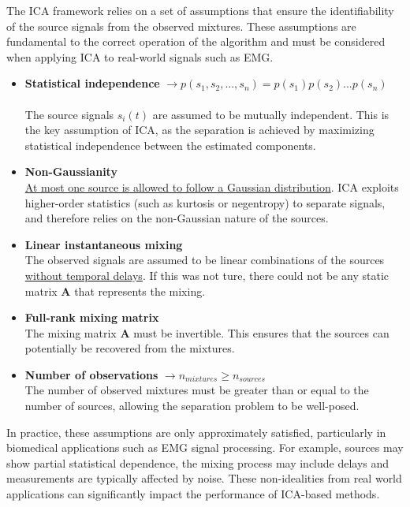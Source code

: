 The ICA framework relies on a set of assumptions that ensure the identifiability of the source signals from the observed mixtures. These assumptions are fundamental to the correct operation of the algorithm and must be considered when applying ICA to real-world signals such as EMG.

\begin{itemize}

\item \textbf{Statistical independence} $\rightarrow p(s_1,s_2,...,s_n)=p(s_1)p(s_2)...p(s_n)$ \\ \\
The source signals $s_i(t)$ are assumed to be mutually independent. This is the key assumption of ICA, as the separation is achieved by maximizing statistical independence between the estimated components.

\item \textbf{Non-Gaussianity} \\

\underline{At most one source is allowed to follow a Gaussian distribution}. ICA exploits higher-order statistics (such as kurtosis or negentropy) to separate signals, and therefore relies on the non-Gaussian nature of the sources.

\item \textbf{Linear instantaneous mixing} \\

The observed signals are assumed to be linear combinations of the sources \underline{without temporal delays}. If this was not ture, there could not be any static matrix $\mathbf{A}$ that represents the mixing.

\item \textbf{Full-rank mixing matrix} \\

The mixing matrix $\mathbf{A}$ must be invertible. This ensures that the sources can potentially be recovered from the mixtures.

\item \textbf{Number of observations}
$\rightarrow n_{mixtures} \geq n_{sources}$\\

The number of observed mixtures must be greater than or equal to the number of sources, allowing the separation problem to be well-posed.

\end{itemize}

In practice, these assumptions are only approximately satisfied, particularly in biomedical applications such as EMG signal processing. For example, sources may show partial statistical dependence, the mixing process may include delays and measurements are typically affected by noise. These non-idealities from real world applications can significantly impact the performance of ICA-based methods.

